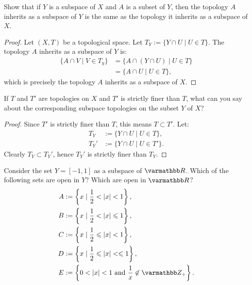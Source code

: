 \documentclass[12pt,twoside,openany]{memoir}
\begin{document}
\begin{exercise}
Show that if $Y$ is a subspace of $X$ and $A$ is a subset of $Y$, then the topology $A$ inherits as a subspace of $Y$ is the same as the topology it inherits as a subspace of $X$.
\end{exercise}
    \begin{proof}
        Let $(X,T)$ be a topological space. Let $T_Y:=\{Y \cap U \mid U \in T\}$. The topology $A$ inherits as a subspace of $Y$ is:
            \begin{equation*}
            \begin{split}
                \{A \cap V \mid V \in T_y\} 
                & = \{A \cap (Y \cap U) \mid U \in T\} \\
                & = \{A \cap U \mid U \in T\},
            \end{split}
            \end{equation*}
        which is precisely the topology $A$ inherits as a subspace of $X$.
    \end{proof}
\begin{exercise}
    If $T$ and $T'$ are topologies on $X$ and $T'$ is strictly finer than $T$, what can you say about the corresponding subspace topologies on the subset $Y$ of $X$?
\end{exercise}
    \begin{proof}
        Since $T'$ is strictly finer than $T$, this means $T \subset T'$. Let:
            \begin{equation*}
            \begin{split}
                T_Y &:= \{Y \cap U \mid U \in T\}, \\
                T_Y' &:= \{Y \cap U \mid U \in T'\}.
            \end{split}
            \end{equation*}
        Clearly $T_Y \subset T_Y'$, hence $T_Y'$ is strictly finer than $T_Y$.
    \end{proof}
\begin{exercise}
Consider the set $Y =[-1,1]$ as a subspace of $\bfR$. Which of the following sets are open in $Y$? Which are open in $\bfR$?
    \begin{equation*}
    \begin{split}
        A &:= \left\{ x \mid \frac{1}{2} < |x| < 1 \right\}, \\
        B &:= \left\{ x \mid \frac{1}{2} < |x| \leq 1 \right\}, \\
        C &:= \left\{ x \mid \frac{1}{2} \leq |x| < 1 \right\}, \\
        D &:= \left\{ x \mid \frac{1}{2} \leq |x| <\leq 1 \right\}, \\
        E &:= \left\{ 0 < |x| < 1 \text{ and }\frac{1}{x} \not\in \bfZ_+\right\}. \\
    \end{split}
    \end{equation*}
\end{exercise}
\end{document}
